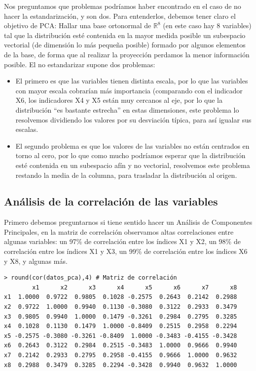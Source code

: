 \documentclass[12pt]{article}
\begin{document}
Nos preguntamos que problemas podríamos haber encontrado en el caso de
no hacer la estandarización, y son dos. Para entenderlos, debemos
tener claro el objetivo de PCA: Hallar una base ortonormal de
$\mathbb{R}^8$ (en este caso hay 8 variables) tal que la distribución
esté contenida en la mayor medida posible un subespacio vectorial (de
dimensión lo más pequeña posible) formado por algunos elementos de la
base, de forma que al realizar la proyección perdamos la menor
información posible. El no estandarizar supone dos problemas:
\begin{itemize}
\item El primero es que las
variables tienen distinta escala, por lo que las variables con mayor
escala cobrarían más importancia (comparando con el indicador X6, los
indicadores X4 y X5 están muy cercanos al eje, por lo que la
distribución ``es bastante estrecha'' en estas dimensiones, este
problema lo resolvemos dividiendo los valores por su desviación
típica, para así igualar sus escalas.
\item El segundo problema es que los valores de las variables no están
  centrados en torno al cero, por lo que como mucho podríamos esperar
  que la distribución esté contenida en un subespacio afín y no
  vectorial, resolvemos este problema restando la media de la columna,
  para trasladar la distribución al origen.
\end{itemize}

\subsection{Análisis de la correlación de las variables}

Primero debemos preguntarnos si tiene sentido hacer un Análisis de
Componentes Principales, en la matriz de correlación observamos altas
correlaciones entre algunas variables: un 97\% de correlación entre
los índices X1 y X2, un 98\% de correlación entre los índices X1 y X3,
un 99\% de correlación entre los índices X6 y X8, y algunas más.

\begin{verbatim}
> round(cor(datos_pca),4) # Matriz de correlación
        x1      x2      x3      x4      x5      x6      x7      x8
x1  1.0000  0.9722  0.9805  0.1028 -0.2575  0.2643  0.2142  0.2988
x2  0.9722  1.0000  0.9940  0.1130 -0.3080  0.3122  0.2933  0.3479
x3  0.9805  0.9940  1.0000  0.1479 -0.3261  0.2984  0.2795  0.3285
x4  0.1028  0.1130  0.1479  1.0000 -0.8409  0.2515  0.2958  0.2294
x5 -0.2575 -0.3080 -0.3261 -0.8409  1.0000 -0.3483 -0.4155 -0.3428
x6  0.2643  0.3122  0.2984  0.2515 -0.3483  1.0000  0.9666  0.9940
x7  0.2142  0.2933  0.2795  0.2958 -0.4155  0.9666  1.0000  0.9632
x8  0.2988  0.3479  0.3285  0.2294 -0.3428  0.9940  0.9632  1.0000
\end{verbatim}
\end{document}
